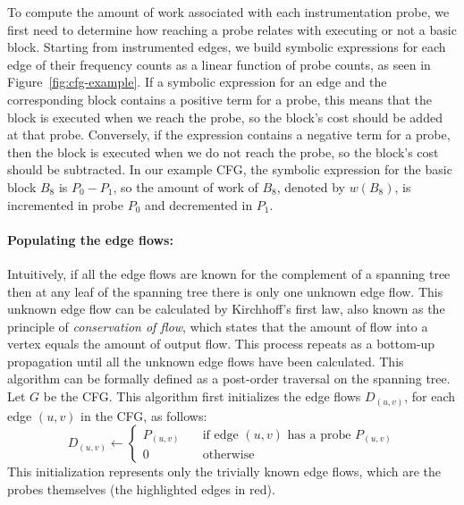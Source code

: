 To compute the amount of work associated
with each instrumentation probe, we first need to determine how reaching a probe relates with executing or not a basic block. Starting from
instrumented edges, we build symbolic expressions for each edge of their frequency counts as a linear function of probe counts, as seen in
Figure~\ref{fig:cfg-example}. If a symbolic expression for an edge and the corresponding block contains a positive term for a probe, this
means that the block is executed when we reach the probe, so the block's cost should be added at that probe. Conversely, if the expression
contains a negative term for a probe, then the block is executed when we do not reach the probe, so the block's cost should be subtracted.
In our example CFG, the symbolic expression for the basic block $B_8$ is $P_0 - P_1$, so the amount of work of $B_8$, denoted by $w(B_8)$,
is incremented in probe $P_0$ and decremented in $P_1$.

\paragraph{Populating the edge flows:}
Intuitively, if all the edge flows are known for the complement of a spanning tree then at any leaf of the spanning tree there is only one
unknown edge flow. This unknown edge flow can be calculated by Kirchhoff's first law\cite{knuth73,ball94},
also known as the principle of \textit{conservation of flow}, which states that
the amount of flow into a vertex equals the amount of output flow.
This process repeats as a bottom-up propagation until all the unknown edge flows have been calculated. This algorithm can be formally defined as a post-order traversal on the
spanning tree. Let $G$ be the CFG. This algorithm first initializes the edge flows $D_{(u,v)}$, for each edge $(u,v)$ in the CFG, as
follows:
\[
D_{(u,v)} \gets
\begin{cases}
    P_{(u,v)} & \quad \text{if edge $(u,v)$ has a probe $P_{(u,v)}$}\\
    0       & \quad \text{otherwise}
\end{cases}
\]
This initialization represents only the trivially known edge flows, which are the
probes themselves (the highlighted edges in red).

